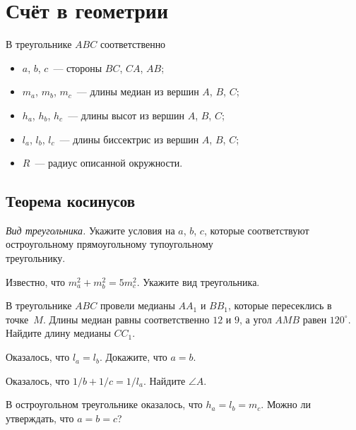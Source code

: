 
\section*{Счёт в геометрии}


В треугольнике $ABC$ соответственно
\begin{itemize}
    \item $a$, $b$, $c$~--- стороны $BC$, $CA$, $AB$;
    \item $m_{a}$, $m_{b}$, $m_{c}$~---
        длины медиан из вершин $A$, $B$, $C$;
    \item $h_{a}$, $h_{b}$, $h_{c}$~---
        длины высот из вершин $A$, $B$, $C$;
    \item $l_{a}$, $l_{b}$, $l_{c}$~---
        длины биссектрис из вершин $A$, $B$, $C$;
    \item $R$~--- радиус описанной окружности.
\end{itemize}

\subsection*{Теорема косинусов}

\begin{problems}

\item \emph{Вид треугольника.}
Укажите условия на $a$, $b$, $c$, которые соответствуют
\\
\subproblem остроугольному
\quad
\subproblem прямоугольному
\quad
\subproblem тупоугольному
\\
треугольнику.

\item
Известно, что $m_{a}^2 + m_{b}^2 = 5 m_{c}^2$.
Укажите вид треугольника.

\item
В треугольнике $ABC$ провели медианы $A A_1$ и $B B_1$, которые пересеклись
в точке~$M$.
Длины медиан равны соответственно $12$ и $9$, а угол $AMB$ равен $120^{\circ}$.
Найдите длину медианы $C C_1$.

\item
Оказалось, что $l_a = l_b$.
Докажите, что $a = b$.

\item
Оказалось, что
\(
    1 / b + 1 / c = 1 / l_a
\).
Найдите $\angle A$.

\item
В остроугольном треугольнике оказалось, что $h_a = l_b = m_c$.
Можно ли утверждать, что $a = b = c$?

\end{problems}

